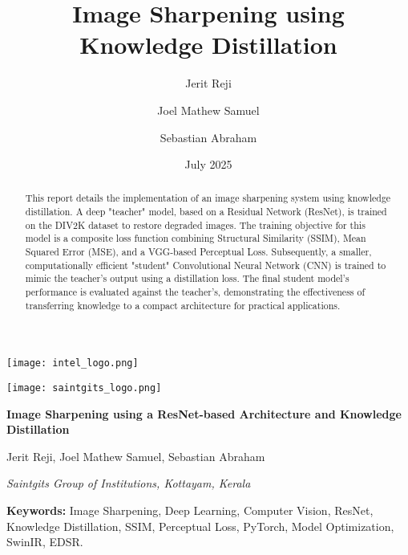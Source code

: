 \documentclass[12pt,a4paper]{article}
\title{Image Sharpening using Knowledge Distillation}
\author[1]{Jerit Reji}
\author[1]{Joel Mathew Samuel}
\author[1]{Sebastian Abraham}
\affil[1]{Saintgits Group of Institutions, Kottayam, Kerala}
\date{July 2025}
\begin{document}
\begin{titlepage}
    \thispagestyle{firstpage}
    
    \begin{minipage}{0.5\textwidth}
        \flushleft \texttt{[image: intel\_logo.png]}
    \end{minipage}%
    \begin{minipage}{0.5\textwidth}
        \flushright \texttt{[image: saintgits\_logo.png]}
    \end{minipage}
    
    \vfill 
    \centering
    {\Huge\bfseries Image Sharpening using a ResNet-based Architecture and Knowledge Distillation \par}
    \vspace{1.5cm} 
    {\Large Jerit Reji, Joel Mathew Samuel, Sebastian Abraham \par}
    \vspace{0.5cm}
    {\large \textit{Saintgits Group of Institutions, Kottayam, Kerala}\par}
    \vfill 
    
\end{titlepage}

\restoregeometry
\pagestyle{fancy} 

\begin{abstract}
\noindent This report details the implementation of an image sharpening system using knowledge distillation. A deep "teacher" model, based on a Residual Network (ResNet), is trained on the DIV2K dataset to restore degraded images. The training objective for this model is a composite loss function combining Structural Similarity (SSIM), Mean Squared Error (MSE), and a VGG-based Perceptual Loss. Subsequently, a smaller, computationally efficient "student" Convolutional Neural Network (CNN) is trained to mimic the teacher's output using a distillation loss. The final student model's performance is evaluated against the teacher's, demonstrating the effectiveness of transferring knowledge to a compact architecture for practical applications.
\end{abstract}

\vspace{0.5cm}
\textbf{Keywords:} Image Sharpening, Deep Learning, Computer Vision, ResNet, Knowledge Distillation, SSIM, Perceptual Loss, PyTorch, Model Optimization, SwinIR, EDSR.
\vspace{1cm}
\end{document}
